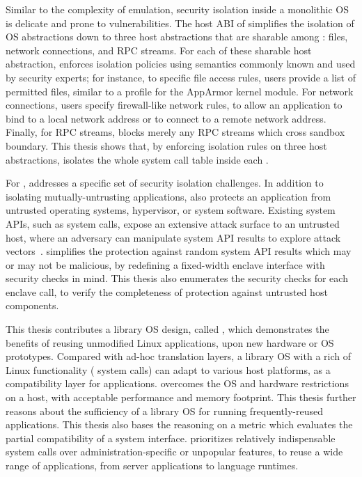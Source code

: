 Similar to the complexity of emulation,
security isolation inside a monolithic OS is delicate and prone to vulnerabilities.
The host ABI of \graphene{} simplifies
the isolation of OS abstractions
down to three host abstractions that are sharable among \picoprocs{}: files, network connections, and RPC streams.
For each of these sharable host abstraction, \graphene{} enforces isolation policies using semantics
commonly known and used by security experts;
for instance, to specific file access rules, users provide a list of permitted files, similar to a profile for the AppArmor kernel module.
For network connections,
users specify firewall-like network rules,
to allow an application
to bind to a local network address or to connect to a remote network address.
Finally, for RPC streams,
\graphene{} blocks merely any RPC streams
which cross sandbox boundary.
This thesis shows that,
by enforcing isolation rules on three host abstractions,
\thehostabi{} isolates the whole system call table inside each \picoproc{}.



For \sgx{}, \graphene{} addresses a specific set of security isolation challenges.
In addition to isolating mutually-untrusting applications,
\graphene{} also protects an \sgx{} application
from untrusted operating systems, hypervisor, or system software.
Existing system APIs, such as system calls, expose an extensive attack surface
to an untrusted host, where an adversary
can manipulate system API results to explore attack vectors~\cite{checkoway13iago}.
\graphene{} simplifies
the protection against random system API results which may or may not be malicious,
by redefining a fixed-width enclave interface
with security checks in mind.
This thesis also enumerates the security checks for each enclave call,
to verify the completeness
of protection against untrusted host components.










This thesis contributes a library OS design, called \graphene{},
which demonstrates the benefits of reusing unmodified Linux applications, upon new hardware or OS prototypes.
Compared with ad-hoc translation layers,
a library OS with a rich of Linux functionality (\graphenesyscallnum{} system calls) can adapt to various host platforms, as a compatibility layer for applications.
\graphene{} overcomes the OS and hardware restrictions on a host, with acceptable performance and memory footprint.
This thesis further reasons about the sufficiency of a library OS
for running frequently-reused applications. This thesis also bases the reasoning on a metric which evaluates the partial compatibility of a system interface.
\graphene{} prioritizes relatively indispensable system calls over administration-specific or unpopular features,
to reuse a wide range of applications, from server applications to language runtimes.


